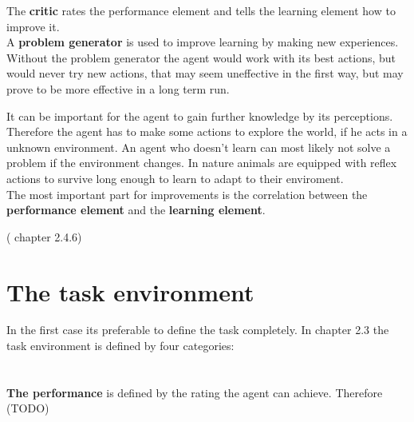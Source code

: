 \documentclass[10pt,a4paper,DIV=11]{scrreprt}
\begin{document}
The \textbf{critic} rates the performance element and tells the learning element how to improve it. \\

A \textbf{problem generator} is used to improve learning by making new experiences. Without the problem generator the agent would work with its best actions, but would never try new actions, that may seem uneffective in the first way, but may prove to be more effective in a long term run. 

It can be important for the agent to gain further knowledge by its perceptions. Therefore the agent has to make some actions to explore the world, if he acts in a unknown environment.
An agent who doesn't learn can most likely not solve a problem if the environment changes.
In nature animals are equipped with reflex actions to survive long enough to learn to adapt to their enviroment. \\


The most important part for improvements is the correlation between the \textbf{performance element} and the \textbf{learning element}.

(\cite{ai} chapter 2.4.6)

\section{The task environment}
\label{sec:env}
In the first case its preferable to define the task completely. In \cite{ai} chapter 2.3 the task environment is defined by four categories: \\

   \\
\\

\textbf{The performance} is defined by the rating the agent can achieve. Therefore (TODO)\\
\end{document}
